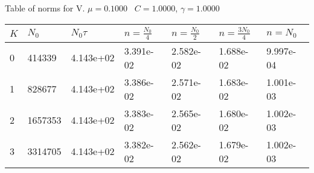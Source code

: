 \begin{center}
Table of norms for V. $\mu = 0.1000$ \, $C = 1.0000$, $\gamma = 1.0000$
  
\begin{tabular}{|p{0.8in}|p{0.8in}|p{0.8in}|p{0.8in}|p{0.8in}|p{0.8in}|p{0.8in}|} \hline
$K$ &$N_0$ &$N_0 \tau$ &$n = \frac{N_0}{4}$ &$n = \frac{N_0}{2}$ &$n = \frac{3N_0}{4}$ &$n = N_0$ \\ \hline 
0 &414339 &4.143e+02 &3.391e-02 &2.582e-02 &1.688e-02 &9.997e-04 \\ \hline 
1 &828677 &4.143e+02 &3.386e-02 &2.571e-02 &1.683e-02 &1.001e-03 \\ \hline 
2 &1657353 &4.143e+02 &3.383e-02 &2.565e-02 &1.680e-02 &1.002e-03 \\ \hline 
3 &3314705 &4.143e+02 &3.382e-02 &2.562e-02 &1.679e-02 &1.002e-03 \\ \hline 

\end{tabular}\\[20pt]
\end{center}
